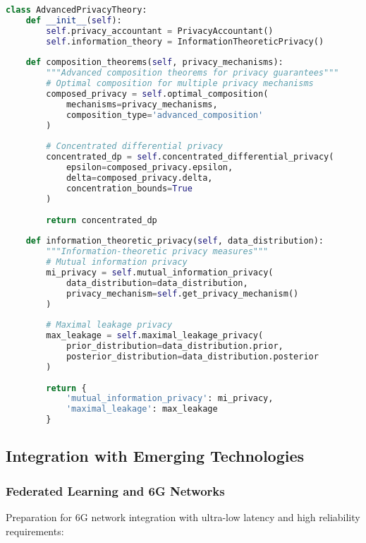 \begin{lstlisting}[language=python, caption=Advanced Privacy Theory]
class AdvancedPrivacyTheory:
    def __init__(self):
        self.privacy_accountant = PrivacyAccountant()
        self.information_theory = InformationTheoreticPrivacy()
        
    def composition_theorems(self, privacy_mechanisms):
        """Advanced composition theorems for privacy guarantees"""
        # Optimal composition for multiple privacy mechanisms
        composed_privacy = self.optimal_composition(
            mechanisms=privacy_mechanisms,
            composition_type='advanced_composition'
        )
        
        # Concentrated differential privacy
        concentrated_dp = self.concentrated_differential_privacy(
            epsilon=composed_privacy.epsilon,
            delta=composed_privacy.delta,
            concentration_bounds=True
        )
        
        return concentrated_dp
        
    def information_theoretic_privacy(self, data_distribution):
        """Information-theoretic privacy measures"""
        # Mutual information privacy
        mi_privacy = self.mutual_information_privacy(
            data_distribution=data_distribution,
            privacy_mechanism=self.get_privacy_mechanism()
        )
        
        # Maximal leakage privacy
        max_leakage = self.maximal_leakage_privacy(
            prior_distribution=data_distribution.prior,
            posterior_distribution=data_distribution.posterior
        )
        
        return {
            'mutual_information_privacy': mi_privacy,
            'maximal_leakage': max_leakage
        }
\end{lstlisting}

\subsection{Integration with Emerging Technologies}

\subsubsection{Federated Learning and 6G Networks}

Preparation for 6G network integration with ultra-low latency and high reliability requirements:


